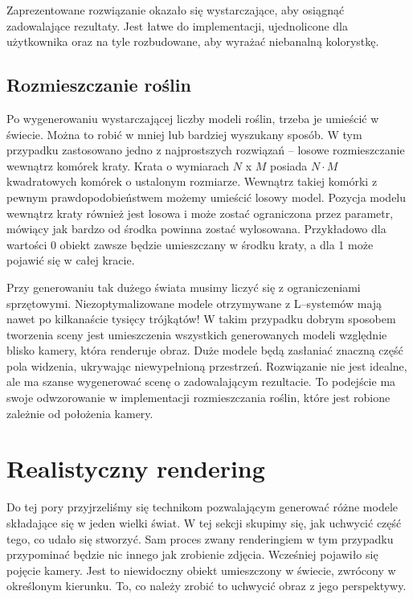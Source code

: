 \documentclass[inz,shortabstract]{iithesis}
\begin{document}
        Zaprezentowane rozwiązanie okazało się wystarczające, aby osiągnąć zadowalające rezultaty. Jest łatwe do implementacji, ujednolicone dla użytkownika oraz na tyle rozbudowane, aby wyrażać niebanalną kolorystkę.
        
    \section{Rozmieszczanie roślin}
        Po wygenerowaniu wystarczającej liczby modeli roślin, trzeba je umieścić w świecie. Można to robić w mniej lub bardziej wyszukany sposób. W tym przypadku zastosowano jedno z najprostszych rozwiązań -- losowe rozmieszczanie wewnątrz komórek kraty. Krata o wymiarach $N$ x $M$ posiada $N \cdot M$ kwadratowych komórek o ustalonym rozmiarze. Wewnątrz takiej komórki z pewnym prawdopodobieństwem możemy umieścić losowy model. Pozycja modelu wewnątrz kraty również jest losowa i może zostać ograniczona przez parametr, mówiący jak bardzo od środka powinna zostać wylosowana. Przykładowo dla wartości 0 obiekt zawsze będzie umieszczany w środku kraty, a dla 1 może pojawić się w całej kracie. 
        
        Przy generowaniu tak dużego świata musimy liczyć się z ograniczeniami sprzętowymi. Niezoptymalizowane modele otrzymywane z L--systemów mają nawet po kilkanaście tysięcy trójkątów! W takim przypadku dobrym sposobem tworzenia sceny jest umieszczenia wszystkich generowanych modeli względnie blisko kamery, która renderuje obraz. Duże modele będą zasłaniać znaczną część pola widzenia, ukrywając niewypełnioną przestrzeń. Rozwiązanie nie jest idealne, ale ma szanse wygenerować scenę o zadowalającym rezultacie. To podejście ma swoje odwzorowanie w implementacji rozmieszczania roślin, które jest robione zależnie od położenia kamery.
        
\chapter{Realistyczny rendering}
    Do tej pory przyjrzeliśmy się technikom pozwalającym generować różne modele składające się w jeden wielki świat. W tej sekcji skupimy się, jak uchwycić część tego, co udało się stworzyć. Sam proces zwany renderingiem w tym przypadku przypominać będzie nic innego jak zrobienie zdjęcia. Wcześniej pojawiło się pojęcie kamery. Jest to niewidoczny obiekt umieszczony w świecie, zwrócony w określonym kierunku. To, co należy zrobić to uchwycić obraz z jego perspektywy. 
    
\end{document}
